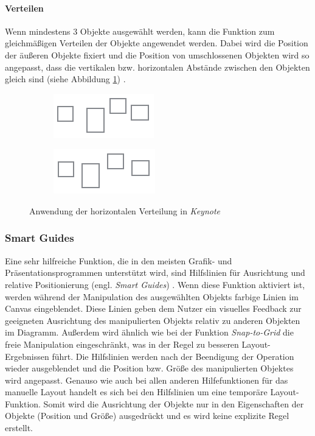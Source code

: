 \paragraph{Verteilen}

Wenn mindestens 3 Objekte ausgewählt werden, kann die Funktion zum gleichmäßigen Verteilen der Objekte angewendet werden. Dabei wird die Position der äußeren Objekte fixiert und die Position von umschlossenen Objekten wird so angepasst, dass die vertikalen bzw. horizontalen Abstände zwischen den Objekten gleich sind (siehe Abbildung \ref{fig:keynote-horizontal-distribution}) \cite{11Keynote}.

\begin{figure}[hbt]
    \newcommand{\subfigurewidth}{0.5\textwidth}
    \begin{subfigure}{\subfigurewidth}
        \centering
        \includegraphics{resources/keynote-horizontal-distribution-a}
        \caption{}
    \end{subfigure}
    \begin{subfigure}{\subfigurewidth}
        \centering
        \includegraphics{resources/keynote-horizontal-distribution-b}
        \caption{}
    \end{subfigure}
    \caption{Anwendung der horizontalen Verteilung in \textit{Keynote}}
    \label{fig:keynote-horizontal-distribution}
\end{figure}

\subsubsection{Smart Guides}
\label{subsubsec:smart-guides}

Eine sehr hilfreiche Funktion, die in den meisten Grafik- und Präsentationsprogrammen unterstützt wird, sind Hilfslinien für Ausrichtung und relative Positionierung (engl. \textit{Smart Guides}) \cite{11Keynote}. Wenn diese Funktion aktiviert ist, werden während der Manipulation des ausgewählten Objekts farbige Linien im Canvas eingeblendet. Diese Linien geben dem Nutzer ein visuelles Feedback zur geeigneten Ausrichtung des manipulierten Objekts relativ zu anderen Objekten im Diagramm. Außerdem wird ähnlich wie bei der Funktion \textit{Snap-to-Grid} die freie Manipulation eingeschränkt, was in der Regel zu besseren Layout-Ergebnissen führt. Die Hilfslinien werden nach der Beendigung der Operation wieder ausgeblendet und die Position bzw. Größe des manipulierten Objektes wird angepasst. Genauso wie auch bei allen anderen Hilfefunktionen für das manuelle Layout handelt es sich bei den Hilfslinien um eine temporäre Layout-Funktion. Somit wird die Ausrichtung der Objekte nur in den Eigenschaften der Objekte (Position und Größe) ausgedrückt und es wird keine explizite Regel erstellt.

